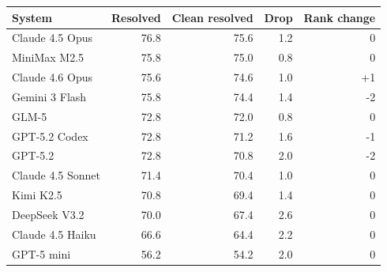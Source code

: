 \begin{tabular}{lrrrr}
\toprule
System & Resolved & Clean resolved & Drop & Rank change \\
\midrule
Claude 4.5 Opus & 76.8 & 75.6 & 1.2 & 0 \\
MiniMax M2.5 & 75.8 & 75.0 & 0.8 & 0 \\
Claude 4.6 Opus & 75.6 & 74.6 & 1.0 & +1 \\
Gemini 3 Flash & 75.8 & 74.4 & 1.4 & -2 \\
GLM-5 & 72.8 & 72.0 & 0.8 & 0 \\
GPT-5.2 Codex & 72.8 & 71.2 & 1.6 & -1 \\
GPT-5.2 & 72.8 & 70.8 & 2.0 & -2 \\
Claude 4.5 Sonnet & 71.4 & 70.4 & 1.0 & 0 \\
Kimi K2.5 & 70.8 & 69.4 & 1.4 & 0 \\
DeepSeek V3.2 & 70.0 & 67.4 & 2.6 & 0 \\
Claude 4.5 Haiku & 66.6 & 64.4 & 2.2 & 0 \\
GPT-5 mini & 56.2 & 54.2 & 2.0 & 0 \\
\bottomrule
\end{tabular}
